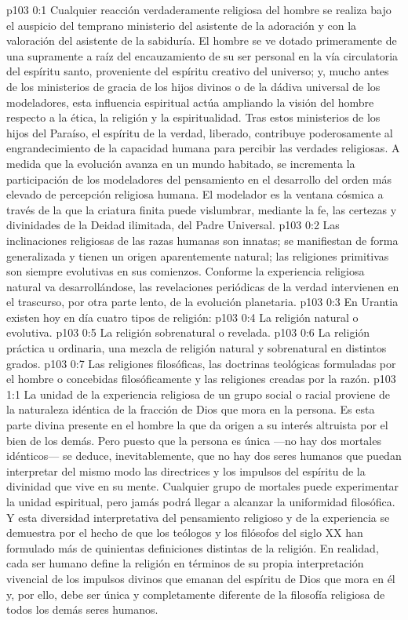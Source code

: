 \author{Melquisedec}
\vs p103 0:1 Cualquier reacción verdaderamente religiosa del hombre se realiza bajo el auspicio del temprano ministerio del asistente de la adoración y con la valoración del asistente de la sabiduría. El hombre se ve dotado primeramente de una supramente a raíz del encauzamiento de su ser personal en la vía circulatoria del espíritu santo, proveniente del espíritu creativo del universo; y, mucho antes de los ministerios de gracia de los hijos divinos o de la dádiva universal de los modeladores, esta influencia espiritual actúa ampliando la visión del hombre respecto a la ética, la religión y la espiritualidad. Tras estos ministerios de los hijos del Paraíso, el espíritu de la verdad, liberado, contribuye poderosamente al engrandecimiento de la capacidad humana para percibir las verdades religiosas. A medida que la evolución avanza en un mundo habitado, se incrementa la participación de los modeladores del pensamiento en el desarrollo del orden más elevado de percepción religiosa humana. El modelador es la ventana cósmica a través de la que la criatura finita puede vislumbrar, mediante la fe, las certezas y divinidades de la Deidad ilimitada, del Padre Universal.
\vs p103 0:2 Las inclinaciones religiosas de las razas humanas son innatas; se manifiestan de forma generalizada y tienen un origen aparentemente natural; las religiones primitivas son siempre evolutivas en sus comienzos. Conforme la experiencia religiosa natural va desarrollándose, las revelaciones periódicas de la verdad intervienen en el trascurso, por otra parte lento, de la evolución planetaria.
\vs p103 0:3 \pc En Urantia existen hoy en día cuatro tipos de religión:
\vs p103 0:4 La religión natural o evolutiva.
\vs p103 0:5 La religión sobrenatural o revelada.
\vs p103 0:6 La religión práctica u ordinaria, una mezcla de religión natural y sobrenatural en distintos grados.
\vs p103 0:7 Las religiones filosóficas, las doctrinas teológicas formuladas por el hombre o concebidas filosóficamente y las religiones creadas por la razón.
\vs p103 1:1 La unidad de la experiencia religiosa de un grupo social o racial proviene de la naturaleza idéntica de la fracción de Dios que mora en la persona. Es esta parte divina presente en el hombre la que da origen a su interés altruista por el bien de los demás. Pero puesto que la persona es única ---no hay dos mortales idénticos--- se deduce, inevitablemente, que no hay dos seres humanos que puedan interpretar del mismo modo las directrices y los impulsos del espíritu de la divinidad que vive en su mente. Cualquier grupo de mortales puede experimentar la unidad espiritual, pero jamás podrá llegar a alcanzar la uniformidad filosófica. Y esta diversidad interpretativa del pensamiento religioso y de la experiencia se demuestra por el hecho de que los teólogos y los filósofos del siglo XX han formulado más de quinientas definiciones distintas de la religión. En realidad, cada ser humano define la religión en términos de su propia interpretación vivencial de los impulsos divinos que emanan del espíritu de Dios que mora en él y, por ello, debe ser única y completamente diferente de la filosofía religiosa de todos los demás seres humanos.
